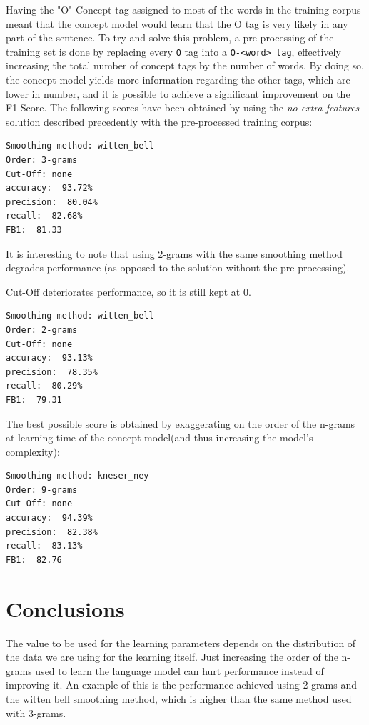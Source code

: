 \documentclass[11pt,a4paper]{article}
\begin{document}
Having the "O" Concept tag assigned to most of the words in the training corpus meant that the concept model would learn that the O tag is very likely in any part of the sentence.
To try and solve this problem, a pre-processing of the training set is done by replacing every \verb|O| tag into a \verb|O-<word> tag|, effectively increasing the total number of concept tags by the number of words.
By doing so, the concept model yields more information regarding the other tags, which are lower in number, and it is possible to achieve a significant improvement on the F1-Score. The following scores have been obtained by using the \textit{no extra features} solution described precedently with the pre-processed training corpus:

\begin{verbatim}
Smoothing method: witten_bell
Order: 3-grams
Cut-Off: none
accuracy:  93.72%
precision:  80.04%
recall:  82.68%
FB1:  81.33
\end{verbatim}

It is interesting to note that using 2-grams with the same smoothing method degrades performance (as opposed to the solution without the pre-processing).

Cut-Off deteriorates performance, so it is still kept at 0.

\begin{verbatim}
Smoothing method: witten_bell
Order: 2-grams
Cut-Off: none
accuracy:  93.13%
precision:  78.35%
recall:  80.29%
FB1:  79.31
\end{verbatim}

The best possible score is obtained by exaggerating on the order of the n-grams at learning time of the concept model(and thus increasing the model's complexity):

\begin{verbatim}
Smoothing method: kneser_ney
Order: 9-grams
Cut-Off: none
accuracy:  94.39%
precision:  82.38%
recall:  83.13%
FB1:  82.76
\end{verbatim}


\section{Conclusions}
The value to be used for the learning parameters depends on the distribution of the data we are using for the learning itself. Just increasing the order of the n-grams used to learn the language model can hurt performance instead of improving it. An example of this is the performance achieved using 2-grams and the witten bell smoothing method, which is higher than the same method used with 3-grams.
\end{document}
